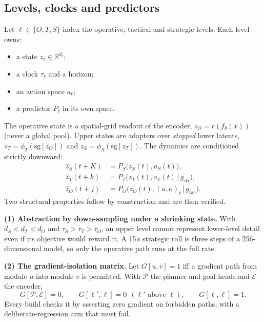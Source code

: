 \documentclass[10pt,twocolumn]{article}
\theoremstyle{remark}
\newcommand{\Rset}{\mathbb{R}}
\begin{document}
\subsection{Levels, clocks and predictors}
Let $\ell\in\{O,T,S\}$ index the operative, tactical and strategic levels. Each level owns:
\begin{itemize}
  \item a state $z_\ell\in\Rset^{d_\ell}$;
  \item a clock $\tau_\ell$ and a horizon;
  \item an action space $a_\ell$;
  \item a predictor $P_\ell$ in its own space.
\end{itemize}
The operative state is a spatial-grid readout of the encoder, $z_O=r(f_\theta(x))$ (never a global pool). Upper states are adapters over
\emph{stopped} lower latents, $z_T=\phi_T(\mathrm{sg}[z_O])$ and $z_S=\phi_S(\mathrm{sg}[z_T])$. The dynamics are conditioned strictly
downward:
\begin{equation}
\begin{aligned}
\hat z_S(t{+}K) &= P_S\big(z_S(t),a_S(t)\big),\\
\hat z_T(t{+}k) &= P_T\big(z_T(t),a_T(t)\,\big|\,g_{\mathrm{str}}\big),\\
\hat z_O(t{+}j) &= P_O\big(z_O(t),(a,\kappa)_t\,\big|\,g_{\mathrm{tac}}\big).
\end{aligned}
\end{equation}
Two structural properties follow by construction and are then verified.

\textbf{(1) Abstraction by down-sampling under a shrinking state.} With $d_S<d_T<d_O$ and $\tau_S>\tau_T>\tau_O$, an upper level cannot
represent lower-level detail even if its objective would reward it. A 15\,s strategic roll is three steps of a 256-dimensional model,
so only the operative path runs at the full rate.

\textbf{(2) The gradient-isolation matrix.} Let $G[u,v]=1$ iff a gradient path from module $u$ into module $v$ is permitted. With
$\mathcal P$ the planner and goal heads and $\mathcal E$ the encoder,
\begin{equation}\label{eq:gmatrix}
G[\mathcal P,\mathcal E]=0,\qquad G[\ell',\ell]=0\ \ (\ell'\text{ above }\ell),\qquad G[\ell,\ell]=1 .
\end{equation}
Every build checks it by asserting zero gradient on forbidden paths, with a deliberate-regression arm that must fail.
\end{document}
